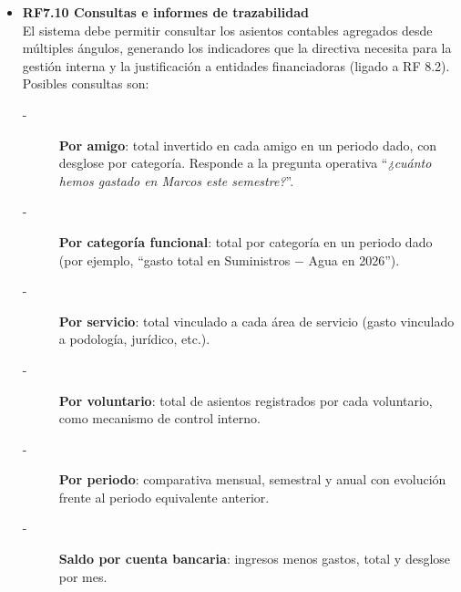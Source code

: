 \begin{itemize}
    \item \textbf{RF7.10 Consultas e informes de trazabilidad} \\
    El sistema debe permitir consultar los asientos contables agregados
    desde múltiples ángulos, generando los indicadores que la directiva
    necesita para la gestión interna y la justificación a entidades
    financiadoras (ligado a RF 8.2). Posibles consultas son:
    \begin{description}
        \item[-] \textbf{Por amigo}: total invertido en cada amigo en un periodo dado,
                con desglose por categoría. Responde a la pregunta operativa
                ``\textit{¿cuánto hemos gastado en Marcos este semestre?}''.
        \item[-] \textbf{Por categoría funcional}: total por categoría en un periodo
                dado (por ejemplo, ``gasto total en Suministros $-$ Agua en 2026'').
        \item[-] \textbf{Por servicio}: total vinculado a cada área de servicio (gasto
                vinculado a podología, jurídico, etc.).
        \item[-] \textbf{Por voluntario}: total de asientos registrados por cada
                voluntario, como mecanismo de control interno.
        \item[-] \textbf{Por periodo}: comparativa mensual, semestral y anual con
                evolución frente al periodo equivalente anterior.
        \item[-] \textbf{Saldo por cuenta bancaria}: ingresos menos gastos, total y desglose por mes.
    \end{description}


\end{itemize}


